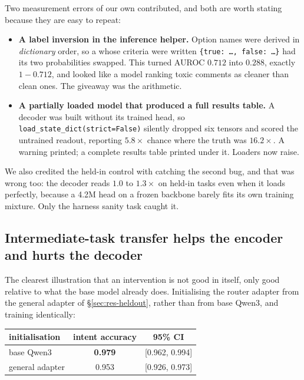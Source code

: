 Two measurement errors of our own contributed, and both are worth stating
because they are easy to repeat:

\begin{itemize}[leftmargin=1.4em,itemsep=0.3em]
  \item \textbf{A label inversion in the inference helper.} Option names
    were derived in \emph{dictionary} order, so a \noul{} whose criteria
    were written \texttt{\{true: \ldots, false: \ldots\}} had its two
    probabilities swapped. This turned AUROC $0.712$ into $0.288$,
    exactly $1 - 0.712$, and looked like a model ranking toxic comments
    as cleaner than clean ones. The giveaway was the arithmetic.
  \item \textbf{A partially loaded model that produced a full results
    table.} A decoder was built without its trained head, so
    \texttt{load\_state\_dict(strict=False)} silently dropped six tensors
    and scored the untrained readout, reporting $5.8\times$ chance where
    the truth was $16.2\times$. A warning printed; a complete results table
    printed under it. Loaders now raise.
\end{itemize}

We also credited the held-in control with catching the second bug, and
that was wrong too: the decoder reads $1.0$ to $1.3\times$ on held-in tasks
even when it loads perfectly, because a 4.2M head on a frozen backbone
barely fits its own training mixture. Only the harness sanity task caught
it.

\subsection{Intermediate-task transfer helps the encoder and hurts the
decoder}
\label{sec:abl-sd6}

The clearest illustration that an intervention is not good in itself, only
good relative to what the base model already does. Initialising the
router adapter from the general adapter of \S\ref{sec:res-heldout},
rather than from base Qwen3, and training identically:

\begin{center}
\begin{tabular}{lcc}
\toprule
initialisation & intent accuracy & 95\% CI \\
\midrule
base Qwen3          & \textbf{0.979} & [0.962, 0.994] \\
general adapter     & 0.953 & [0.926, 0.973] \\
\bottomrule
\end{tabular}
\end{center}

